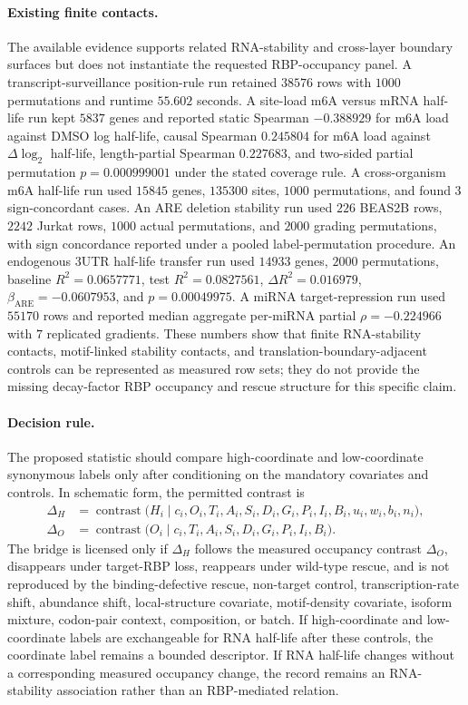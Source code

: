 \paragraph{Existing finite contacts.} The available evidence supports related RNA-stability and cross-layer boundary surfaces but does not instantiate the requested RBP-occupancy panel. A transcript-surveillance position-rule run retained $38576$ rows with $1000$ permutations and runtime $55.602$ seconds. A site-load m6A versus mRNA half-life run kept $5837$ genes and reported static Spearman $-0.388929$ for m6A load against DMSO log half-life, causal Spearman $0.245804$ for m6A load against $\Delta\log_2$ half-life, length-partial Spearman $0.227683$, and two-sided partial permutation $p=0.000999001$ under the stated coverage rule. A cross-organism m6A half-life run used $15845$ genes, $135300$ sites, $1000$ permutations, and found $3$ sign-concordant cases. An ARE deletion stability run used $226$ BEAS2B rows, $2242$ Jurkat rows, $1000$ actual permutations, and $2000$ grading permutations, with sign concordance reported under a pooled label-permutation procedure. An endogenous 3UTR half-life transfer run used $14933$ genes, $2000$ permutations, baseline $R^2=0.0657771$, test $R^2=0.0827561$, $\Delta R^2=0.016979$, $\beta_{\mathrm{ARE}}=-0.0607953$, and $p=0.00049975$. A miRNA target-repression run used $55170$ rows and reported median aggregate per-miRNA partial $\rho=-0.224966$ with $7$ replicated gradients. These numbers show that finite RNA-stability contacts, motif-linked stability contacts, and translation-boundary-adjacent controls can be represented as measured row sets; they do not provide the missing decay-factor RBP occupancy and rescue structure for this specific claim.

\paragraph{Decision rule.} The proposed statistic should compare high-coordinate and low-coordinate synonymous labels only after conditioning on the mandatory covariates and controls. In schematic form, the permitted contrast is
$$
\begin{aligned}
\Delta_H
  &= \operatorname{contrast}\bigl(H_i \mid c_i, O_i, T_i, A_i, S_i, D_i, G_i, P_i, I_i, B_i, u_i, w_i, b_i, n_i\bigr),\\
\Delta_O
  &= \operatorname{contrast}\bigl(O_i \mid c_i, T_i, A_i, S_i, D_i, G_i, P_i, I_i, B_i\bigr).
\end{aligned}
$$
The bridge is licensed only if $\Delta_H$ follows the measured occupancy contrast $\Delta_O$, disappears under target-RBP loss, reappears under wild-type rescue, and is not reproduced by the binding-defective rescue, non-target control, transcription-rate shift, abundance shift, local-structure covariate, motif-density covariate, isoform mixture, codon-pair context, composition, or batch. If high-coordinate and low-coordinate labels are exchangeable for RNA half-life after these controls, the coordinate label remains a bounded descriptor. If RNA half-life changes without a corresponding measured occupancy change, the record remains an RNA-stability association rather than an RBP-mediated relation.

